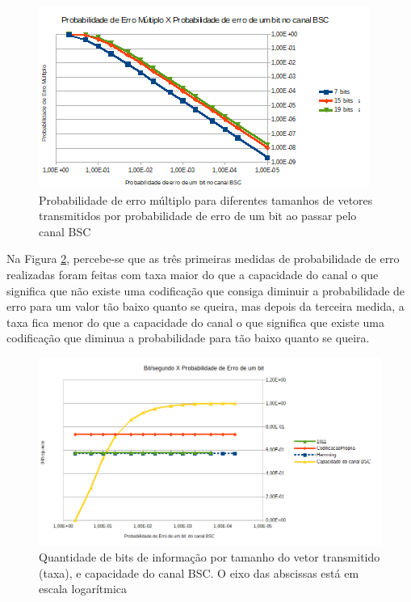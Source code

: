 \documentclass[journal,comsoc]{IEEEtran}
\begin{document}
		\begin{figure}[hbt]
			\centering
			\includegraphics[width=\columnwidth]{../img/binominal_erro_multiplo.png}%
			\caption{Probabilidade de erro múltiplo para diferentes tamanhos de vetores transmitidos por probabilidade de erro de um bit ao passar pelo canal BSC}%
			\label{fig:F}%
		\end{figure}
			
		Na Figura \ref{fig:G}, percebe-se que as três primeiras medidas de	probabilidade de erro realizadas foram feitas com taxa maior do que a capacidade do canal o que significa que não existe uma codificação que consiga diminuir a probabilidade de erro para um valor tão baixo quanto se queira, mas depois da terceira medida, a taxa fica menor do que a capacidade do canal o que significa que existe uma codificação que diminua	a probabilidade para tão baixo quanto se queira.
		
		\begin{figure}[hbt]
			\centering
			\includegraphics[width=\columnwidth]{../img/Capacidade_Canal.png}%
			\caption{Quantidade de bits de informação por tamanho do vetor transmitido (taxa), e capacidade do canal BSC. O eixo das abscissas está em escala logarítmica}%
			\label{fig:G}%
		\end{figure}
	
\end{document}
